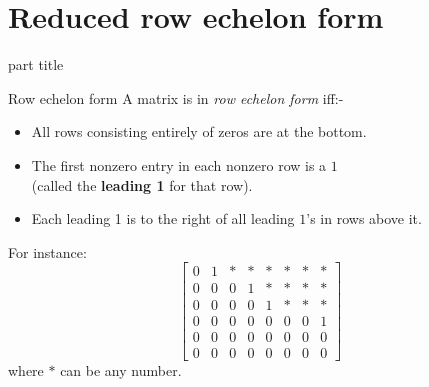 \documentclass{beamer}
\begin{document}
\section{Reduced row echelon form}
\label{sec:Reduced-row-echelon-form}

\begin{frame}
    \begin{beamercolorbox}[sep=12pt,center]{part title}
      \insertsection\par
    \end{beamercolorbox}
\end{frame}
\begin{frame}{Row echelon form}
  A matrix is in \emph{row echelon form} iff:-
  \begin{itemize}
  \item All rows consisting entirely of zeros are at the 
    bottom.
  \item The first nonzero entry in each nonzero row is a $1$
    \\(called the {\bf leading 1} for that row).
  \item Each leading 1 is to the right of all leading $1$'s 
    in rows above it.
  \end{itemize}
  For instance:
  \begin{equation*}
    \left[\begin{array}{rrrrrrrr}
            0 & 1 & * & * & * & * & * & * \\
            0 & 0 & 0 & 1 & * & * & * & * \\
            0 & 0 & 0 & 0 & 1 & * & * & * \\
            0 & 0 & 0 & 0 & 0 & 0 & 0 & 1 \\
            0 & 0 & 0 & 0 & 0 & 0 & 0 & 0 \\
            0 & 0 & 0 & 0 & 0 & 0 & 0 & 0 
          \end{array}\right]
      \end{equation*}
      where $*$ can be any number.
\end{frame}
\end{document}
